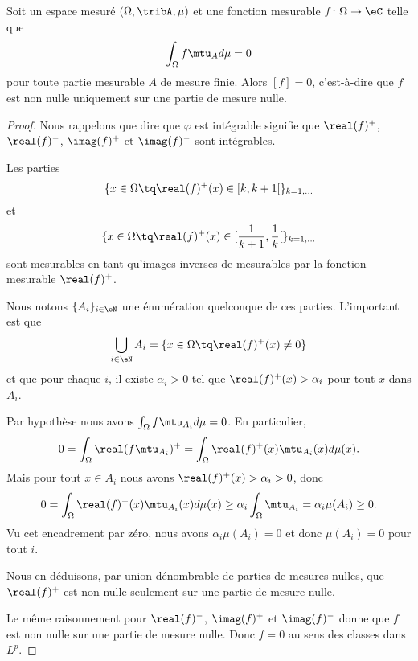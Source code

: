 \begin{proposition} \label{PropRERZooYcEchc}
	Soit un espace mesuré \( (\Omega,\tribA,\mu)\) et une fonction mesurable \( f\colon \Omega\to \eC \) telle que
	\begin{equation}
		\int_{\Omega}f\mtu_Ad\mu=0
	\end{equation}
	pour toute partie mesurable \( A\) de mesure finie. Alors \( [f]=0\), c'est-à-dire que \( f\) est non nulle uniquement sur une partie de mesure nulle.
\end{proposition}

\begin{proof}
	Nous rappelons que dire que \( \varphi\) est intégrable signifie que \( \real(f)^+\), \( \real(f)^-\), \( \imag(f)^+\) et \( \imag(f)^-\) sont intégrables.

	Les parties
	\begin{equation}
		\{ x\in \Omega \tq \real(f)^+(x)\in \mathopen[ k , k+1 \mathclose[ \}_{k=1,\ldots}
	\end{equation}
	et
	\begin{equation}
		\{ x\in \Omega \tq \real(f)^+(x)\in \mathopen[ \frac{1}{ k+1 } , \frac{1}{ k } \mathclose[ \}_{k=1,\ldots}
	\end{equation}
	sont mesurables en tant qu'images inverses de mesurables par la fonction mesurable \( \real(f)^+\).

	Nous notons \( \{ A_i \}_{i\in \eN}\) une énumération quelconque de ces parties. L'important est que
	\begin{equation}
		\bigcup_{i\in \eN}A_i=\{ x\in \Omega\tq \real(f)^+(x)\neq 0 \}
	\end{equation}
	et que pour chaque \( i\), il existe \( \alpha_i>0\) tel que \( \real(f)^+(x)>\alpha_i\) pour tout \( x\) dans \( A_i\).

	Par hypothèse nous avons \( \int_{\Omega}f\mtu_{A_i}d\mu=0\). En particulier,
	\begin{equation}
		0=\int_{\Omega}\real(f\mtu_{A_i})^+=\int_{\Omega}\real(f)^+(x)\mtu_{A_i}(x)d\mu(x).
	\end{equation}
	Mais pour tout \( x\in A_i\) nous avons \( \real(f)^+(x)>\alpha_i>0\), donc
	\begin{equation}
		0=\int_{\Omega}\real(f)^+(x)\mtu_{A_i}(x)d\mu(x)\geq \alpha_i\int_{\Omega}\mtu_{A_i}=\alpha_i\mu(A_i)\geq 0.
	\end{equation}
	Vu cet encadrement par zéro, nous avons \( \alpha_i\mu(A_i)=0\) et donc \( \mu(A_i)=0\) pour tout \( i\).

	Nous en déduisons, par union dénombrable de parties de mesures nulles, que \( \real(f)^+\) est non nulle seulement sur une partie de mesure nulle.

	Le même raisonnement pour \( \real(f)^-\), \( \imag(f)^+\) et \( \imag(f)^-\) donne que \( f\) est non nulle sur une partie de mesure nulle. Donc \( f=0\) au sens des classes dans \( L^p\).
\end{proof}


